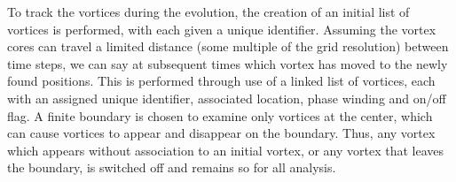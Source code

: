  To track the vortices during the evolution, the creation of an initial list of vortices is performed, with each given a unique identifier. Assuming the vortex cores can travel a limited distance (some multiple of the grid resolution) between time steps, we can say at subsequent times which vortex has moved to the newly found positions. This is performed through use of a linked list of vortices, each with an assigned unique identifier, associated location, phase winding and on/off flag. A finite boundary is chosen to examine only vortices at the center, which can cause vortices to appear and disappear on the boundary. Thus, any vortex which appears without association to an initial vortex, or any vortex that leaves the boundary, is switched off and remains so for all analysis.
